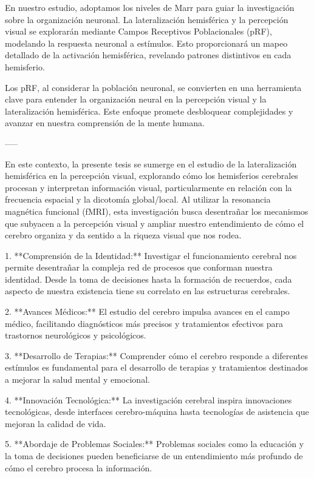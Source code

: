 \documentclass[12pt,oneside]{uhthesis}
\begin{document}
En nuestro estudio, adoptamos los niveles de Marr para guiar la investigación sobre la organización neuronal. La lateralización hemisférica y la percepción visual se explorarán mediante Campos Receptivos Poblacionales (pRF), modelando la respuesta neuronal a estímulos. Esto proporcionará un mapeo detallado de la activación hemisférica, revelando patrones distintivos en cada hemisferio.

Los pRF, al considerar la población neuronal, se convierten en una herramienta clave para entender la organización neural en la percepción visual y la lateralización hemisférica. Este enfoque promete desbloquear complejidades y avanzar en nuestra comprensión de la mente humana.

-----

En este contexto, la presente tesis se sumerge en el estudio de la lateralización hemisférica en la percepción visual, explorando cómo los hemisferios cerebrales procesan y interpretan información visual, particularmente en relación con la frecuencia espacial y la dicotomía global/local. Al utilizar la resonancia magnética funcional (fMRI), esta investigación busca desentrañar los mecanismos que subyacen a la percepción visual y ampliar nuestro entendimiento de cómo el cerebro organiza y da sentido a la riqueza visual que nos rodea.

1. **Comprensión de la Identidad:** Investigar el funcionamiento cerebral nos permite desentrañar la compleja red de procesos que conforman nuestra identidad. Desde la toma de decisiones hasta la formación de recuerdos, cada aspecto de nuestra existencia tiene su correlato en las estructuras cerebrales.

2. **Avances Médicos:** El estudio del cerebro impulsa avances en el campo médico, facilitando diagnósticos más precisos y tratamientos efectivos para trastornos neurológicos y psicológicos.

3. **Desarrollo de Terapias:** Comprender cómo el cerebro responde a diferentes estímulos es fundamental para el desarrollo de terapias y tratamientos destinados a mejorar la salud mental y emocional.

4. **Innovación Tecnológica:** La investigación cerebral inspira innovaciones tecnológicas, desde interfaces cerebro-máquina hasta tecnologías de asistencia que mejoran la calidad de vida.

5. **Abordaje de Problemas Sociales:** Problemas sociales como la educación y la toma de decisiones pueden beneficiarse de un entendimiento más profundo de cómo el cerebro procesa la información.
\end{document}
